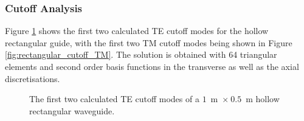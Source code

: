 \subsubsection{Cutoff Analysis}

Figure \ref{fig:rectangular_cutoff_TE} shows the first two calculated
TE cutoff modes for the hollow rectangular guide, with the first two
TM cutoff modes being shown in Figure
\ref{fig:rectangular_cutoff_TM}. The solution is obtained with 64
triangular elements and second order basis functions in the transverse
as well as the axial discretisations.
\begin{figure}[ht]
\centering
\caption{The first two calculated TE cutoff modes of a $1$~m~$\times~0.5$~m hollow rectangular waveguide.}
\label{fig:rectangular_cutoff_TE}
\end{figure}

